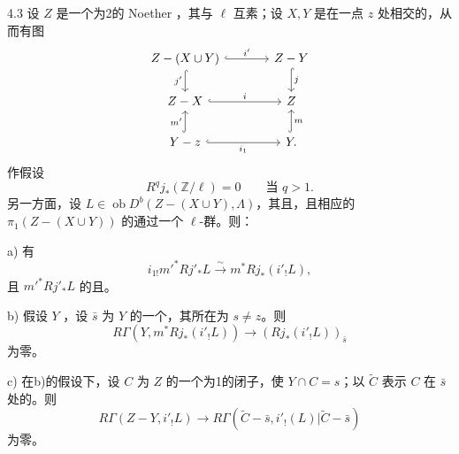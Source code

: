 \begin{SGAresult}{}{4.3}
设 $Z$ 是一个为2的 Noether ，其与 $\ell$ 互素；设 $X,Y$ 是在一点 $z$ 处相交的，从而有图
\[
\begin{tikzcd}[column sep=large]
 Z-(X\cup Y)\arrow[r,hook,"i'"]\arrow[d,hook,"j'"']&Z-Y\arrow[d,hook,"j"]\\
 Z-X\arrow[r,hook,"i"]&Z\\
 Y-z\arrow[u,hook,"m'"]\arrow[r,hook,"i_1"']&Y\arrow[u,hook,"m"'].
\end{tikzcd}
\]
作假设
\[
 R^qj_*(\mathbb Z/\ell)=0\qquad\text{当 }q>1.\tag{P}
\]
另一方面，设 $L\in\operatorname{ob}D^b(Z-(X\cup Y),\Lambda)$，其且，且相应的 $\pi_1(Z-(X\cup Y))$ 的通过一个 $\ell$-群。则：

 a) 有
\[
 i_{1!}m'^*Rj'_*L\xrightarrow{\sim}m^*Rj_*(i'_!L),
\]
且 $m'^*Rj'_*L$ 的且。

 b) 假设 $Y$ ，设 $\bar s$ 为 $Y$ 的一个，其所在为 $s\ne z$。则
\[
 R\Gamma(Y,m^*Rj_*(i'_!L))\longrightarrow(Rj_*(i'_!L))_{\bar s}\tag{4.3.1}
\]
为零。

 c) 在b)的假设下，设 $C$ 为 $Z$ 的一个为1的闭子，使 $Y\cap C=s$；以 $\widetilde C$ 表示 $C$ 在 $\bar s$ 处的。则
\[
 R\Gamma(Z-Y,i'_!L)\longrightarrow
 R\Gamma(\widetilde C-\bar s,i'_!(L)|\widetilde C-\bar s)\tag{4.3.2}
\]
为零。
\end{SGAresult}
